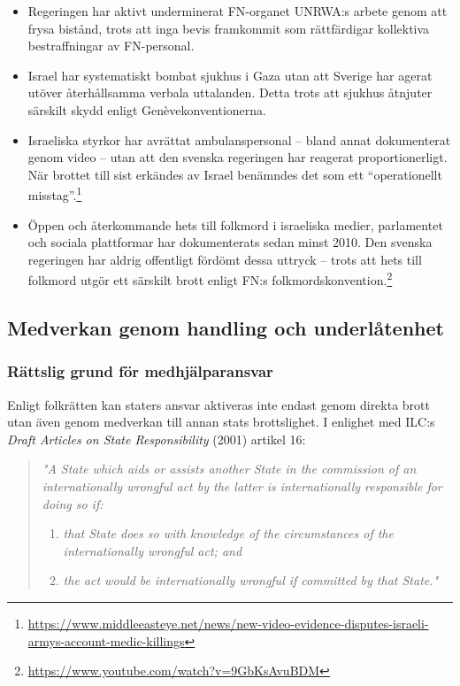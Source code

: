 \begin{itemize}
    \item Regeringen har aktivt underminerat FN-organet UNRWA:s arbete genom att frysa bistånd, trots att inga bevis framkommit som rättfärdigar kollektiva bestraffningar av FN-personal.
    
    \item Israel har systematiskt bombat sjukhus i Gaza utan att Sverige har agerat utöver återhållsamma verbala uttalanden. Detta trots att sjukhus åtnjuter särskilt skydd enligt Genèvekonventionerna.
    
    \item Israeliska styrkor har avrättat ambulanspersonal – bland annat dokumenterat genom video – utan att den svenska regeringen har reagerat proportionerligt. När brottet till sist erkändes av Israel benämndes det som ett \enquote{operationellt misstag}.\footnote{\url{https://www.middleeasteye.net/news/new-video-evidence-disputes-israeli-armys-account-medic-killings}}
    
    \item Öppen och återkommande hets till folkmord i israeliska medier, parlamentet och sociala plattformar har dokumenterats sedan minst 2010. Den svenska regeringen har aldrig offentligt fördömt dessa uttryck – trots att hets till folkmord utgör ett särskilt brott enligt FN:s folkmordskonvention.\footnote{\url{https://www.youtube.com/watch?v=9GbKsAvuBDM}}
\end{itemize}


\subsection{Medverkan genom handling och underlåtenhet}
\label{subsec:konkludent}

\subsubsection{Rättslig grund för medhjälparansvar}
Enligt folkrätten kan staters ansvar aktiveras inte endast genom direkta brott utan även genom medverkan till annan stats brottslighet. I enlighet med ILC:s \textit{Draft Articles on State Responsibility} (2001) artikel 16:

\begin{quote}
\textit{"A State which aids or assists another State in the commission of an internationally wrongful act by the latter is internationally responsible for doing so if:}
\begin{enumerate}
    \item \textit{that State does so with knowledge of the circumstances of the internationally wrongful act; and}
    \item \textit{the act would be internationally wrongful if committed by that State."}
\end{enumerate}
\end{quote}

